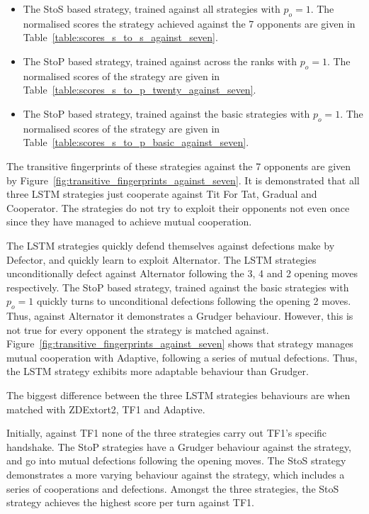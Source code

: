 \begin{itemize}
    \item The StoS based strategy, trained against all strategies with $p_o=1$.
    The normalised scores the strategy achieved against the 7 opponents are
    given in Table~\ref{table:scores_s_to_s_against_seven}.
    \item The StoP based strategy, trained against across the ranks with
    $p_o=1$. The normalised scores of the strategy are given in
    Table~\ref{table:scores_s_to_p_twenty_against_seven}.
    \item The StoP based strategy, trained against the basic strategies with
    $p_o=1$. The normalised scores of the strategy are given in
    Table~\ref{table:scores_s_to_p_basic_against_seven}.
\end{itemize}

The transitive fingerprints of these strategies against the 7 opponents are given by
Figure~\ref{fig:transitive_fingerprints_against_seven}. It is demonstrated that
all three LSTM strategies just cooperate against Tit For Tat, Gradual and
Cooperator. The strategies do not try to exploit their opponents not even once
since they have managed to achieve mutual cooperation.

The LSTM strategies quickly defend themselves against defections make by
Defector, and quickly learn to exploit Alternator. The LSTM strategies
unconditionally defect against Alternator following the 3, 4 and 2 opening moves
respectively. The StoP based strategy, trained against the basic strategies with
$p_o=1$ quickly turns to unconditional defections following the opening 2 moves.
Thus, against Alternator it demonstrates a Grudger behaviour. However, this is
not true for every opponent the strategy is matched against.
Figure~\ref{fig:transitive_fingerprints_against_seven} shows that strategy
manages mutual cooperation with Adaptive, following a series of mutual
defections. Thus, the LSTM strategy exhibits more adaptable behaviour than
Grudger.

The biggest difference between the three LSTM strategies behaviours are when
matched with ZDExtort2, TF1 and Adaptive. 

Initially, against TF1 none of the
three strategies carry out TF1's specific handshake. The StoP strategies have a Grudger
behaviour against the strategy, and go into mutual defections following the
opening moves. The StoS strategy demonstrates a more varying behaviour against
the strategy, which includes a series of cooperations and defections. Amongst
the three strategies, the StoS strategy achieves the highest score per turn
against TF1.

